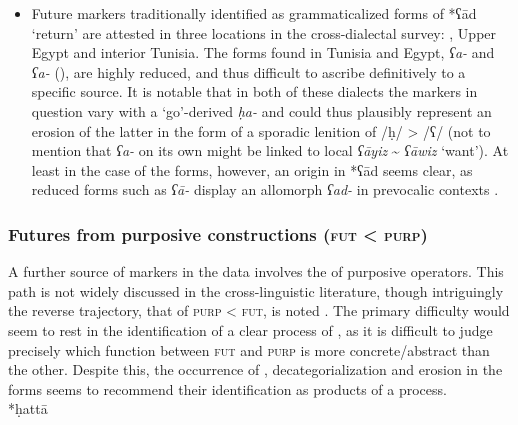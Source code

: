 \documentclass[output=paper]{langsci/langscibook}
\begin{document}
\begin{itemize}

  \item[]
Future  markers traditionally identified as grammaticalized forms of *ʕād ‘return’ are attested in three locations in the cross-dialectal survey: , Upper Egypt and interior Tunisia. The forms found in Tunisia and Egypt,  \textit{ʕa-} and  \textit{ʕa-} (\citealt{Saada1984,Schroepfer2019}), are highly reduced, and thus difficult to ascribe definitively to a specific source. It is notable that in both of these dialects the markers in question vary with a ‘go’-derived  \textit{ḥa-} and could thus plausibly represent an erosion of the latter in the form of a sporadic lenition of /ḥ/ > /ʕ/ (not to mention that  \textit{ʕa-} on its own might be linked to local \textit{ʕāyiz} {\textasciitilde} \textit{ʕāwiz} ‘want’). At least in the case of the  forms, however, an origin in *ʕād seems clear, as reduced forms such as  \textit{ʕā-} display an allomorph \textit{ʕad-} in prevocalic contexts \citep{Watson1993}.
\end{itemize}

\subsubsection{ Futures from purposive constructions (\textsc{fut} < \textsc{purp})}

A further source of   markers in the  data involves the  of purposive operators. This path is not widely discussed in the cross-linguistic  literature, though intriguingly the reverse trajectory, that of \textsc{purp} < \textsc{fut}, is noted \citep{Bybee1994}. The primary difficulty would seem to rest in the identification of a clear process of , as it is difficult to judge precisely which function between \textsc{fut} and \textsc{purp} is more concrete/abstract than the other. Despite this, the occurrence of , decategorialization and erosion in the  forms seems to recommend their identification as products of a  process.\\
 
*ḥattā
\end{document}
